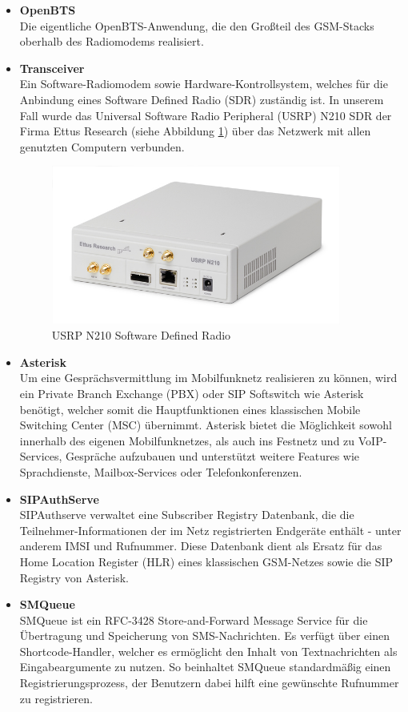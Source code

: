\begin{itemize}
\item \textbf{OpenBTS}\\
Die eigentliche OpenBTS-Anwendung, die den Großteil des GSM-Stacks oberhalb des Radiomodems realisiert.

\item \textbf{Transceiver}\\
Ein Software-Radiomodem sowie Hardware-Kontrollsystem, welches für die Anbindung eines Software Defined Radio (SDR) zuständig ist. In unserem Fall wurde das Universal Software Radio Peripheral (USRP) N210 SDR  der Firma Ettus Research (siehe Abbildung \ref{fig:n210}) über das Netzwerk mit allen genutzten Computern verbunden.
\begin{figure}[htbp]
    \centering
    \includegraphics[width=0.90\textwidth]{includes/ettus_n210}
    \caption{USRP N210 Software Defined Radio}
	\label{fig:n210}
\end{figure}

\newpage
\item \textbf{Asterisk}\\
Um eine Gesprächsvermittlung im Mobilfunknetz realisieren zu können, wird ein Private Branch Exchange (PBX) oder SIP Softswitch wie Asterisk benötigt, welcher somit die Hauptfunktionen eines klassischen Mobile Switching Center (MSC) übernimmt. Asterisk bietet die Möglichkeit sowohl innerhalb des eigenen Mobilfunknetzes, als auch ins Festnetz und zu VoIP-Services, Gespräche aufzubauen und unterstützt weitere Features wie Sprachdienste, Mailbox-Services oder Telefonkonferenzen.

\item \textbf{SIPAuthServe}\\
SIPAuthserve verwaltet eine Subscriber Registry Datenbank, die die Teilnehmer-Informationen der im Netz registrierten Endgeräte enthält - unter anderem IMSI und Rufnummer. Diese Datenbank dient als Ersatz für das Home Location Register (HLR) eines klassischen GSM-Netzes sowie die SIP Registry von Asterisk.

\item \textbf{SMQueue}\\
SMQueue ist ein RFC-3428 Store-and-Forward Message Service für die Übertragung und Speicherung von SMS-Nachrichten. Es verfügt über einen Shortcode-Handler, welcher es ermöglicht den Inhalt von Textnachrichten als Eingabeargumente zu nutzen. So beinhaltet SMQueue standardmäßig einen Registrierungsprozess, der Benutzern dabei hilft eine gewünschte Rufnummer zu registrieren.
\end{itemize}

